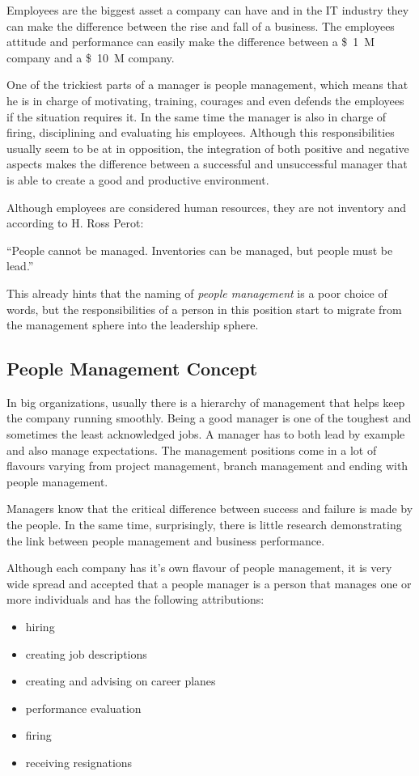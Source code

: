 Employees are the biggest asset a company can have and in the IT industry they can make the difference between the rise and fall of a business. 
The employees attitude and performance can easily make the difference between a \SI{1}[\$]{M} company and a \SI{10}[\$]{M} company.

One of the trickiest parts of a manager is people management, which means that he is in charge of motivating, training, courages and even defends the employees if the situation requires it. In the same time the manager is also in charge of firing, disciplining and evaluating his employees. Although this responsibilities usually seem to be at in opposition, the integration of both positive and negative aspects makes the difference between a successful and unsuccessful manager that is able to create a good and productive environment.

Although employees are considered human resources, they are not inventory and according to H. Ross Perot:
\begin{displayquote}
``People cannot be managed. Inventories can be managed, but people must be lead.''
\end{displayquote}
This already hints that the naming of \textit{people management} is a poor choice of words, but the responsibilities of a person in this position start to migrate from the management sphere into the leadership sphere.

\subsection{People Management Concept}
\label{sub-sec:pmconcept}

In big organizations, usually there is a hierarchy of management that helps keep the company running smoothly. Being a good manager is one of the toughest and sometimes the least acknowledged jobs. A manager has to both lead by example and also manage expectations. The management positions come in a lot of flavours varying from project management, branch management and ending with people management. 

Managers know that the critical difference between success and failure is made by the people. In the same time, surprisingly, there is little research demonstrating the link between people management and business performance. 

Although each company has it's own flavour of people management, it is very wide spread and accepted that a people manager is a person that manages one or more individuals and has the following attributions:
\begin{itemize}
\item hiring
\item creating job descriptions
\item creating and advising on career planes
\item performance evaluation
\item firing
\item receiving resignations
\end{itemize}

